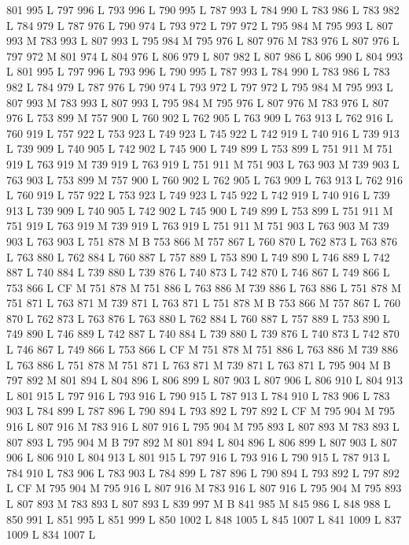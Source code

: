{{{{{{{{{{{{{{{{{{801 995 L
797 996 L
793 996 L
790 995 L
787 993 L
784 990 L
783 986 L
783 982 L
784 979 L
787 976 L
790 974 L
793 972 L
797 972 L
795 984 M 795 993 L
807 993 M 783 993 L
807 993 L
795 984 M 795 976 L
807 976 M 783 976 L
807 976 L
797 972 M 801 974 L
804 976 L
806 979 L
807 982 L
807 986 L
806 990 L
804 993 L
801 995 L
797 996 L
793 996 L
790 995 L
787 993 L
784 990 L
783 986 L
783 982 L
784 979 L
787 976 L
790 974 L
793 972 L
797 972 L
795 984 M 795 993 L
807 993 M 783 993 L
807 993 L
795 984 M 795 976 L
807 976 M 783 976 L
807 976 L
753 899 M 757 900 L
760 902 L
762 905 L
763 909 L
763 913 L
762 916 L
760 919 L
757 922 L
753 923 L
749 923 L
745 922 L
742 919 L
740 916 L
739 913 L
739 909 L
740 905 L
742 902 L
745 900 L
749 899 L
753 899 L
751 911 M 751 919 L
763 919 M 739 919 L
763 919 L
751 911 M 751 903 L
763 903 M 739 903 L
763 903 L
753 899 M 757 900 L
760 902 L
762 905 L
763 909 L
763 913 L
762 916 L
760 919 L
757 922 L
753 923 L
749 923 L
745 922 L
742 919 L
740 916 L
739 913 L
739 909 L
740 905 L
742 902 L
745 900 L
749 899 L
753 899 L
751 911 M 751 919 L
763 919 M 739 919 L
763 919 L
751 911 M 751 903 L
763 903 M 739 903 L
763 903 L
751 878 M B
753 866 M 757 867 L
760 870 L
762 873 L
763 876 L
763 880 L
762 884 L
760 887 L
757 889 L
753 890 L
749 890 L
746 889 L
742 887 L
740 884 L
739 880 L
739 876 L
740 873 L
742 870 L
746 867 L
749 866 L
753 866 L
CF M
751 878 M 751 886 L
763 886 M 739 886 L
763 886 L
751 878 M 751 871 L
763 871 M 739 871 L
763 871 L
751 878 M B
753 866 M 757 867 L
760 870 L
762 873 L
763 876 L
763 880 L
762 884 L
760 887 L
757 889 L
753 890 L
749 890 L
746 889 L
742 887 L
740 884 L
739 880 L
739 876 L
740 873 L
742 870 L
746 867 L
749 866 L
753 866 L
CF M
751 878 M 751 886 L
763 886 M 739 886 L
763 886 L
751 878 M 751 871 L
763 871 M 739 871 L
763 871 L
795 904 M B
797 892 M 801 894 L
804 896 L
806 899 L
807 903 L
807 906 L
806 910 L
804 913 L
801 915 L
797 916 L
793 916 L
790 915 L
787 913 L
784 910 L
783 906 L
783 903 L
784 899 L
787 896 L
790 894 L
793 892 L
797 892 L
CF M
795 904 M 795 916 L
807 916 M 783 916 L
807 916 L
795 904 M 795 893 L
807 893 M 783 893 L
807 893 L
795 904 M B
797 892 M 801 894 L
804 896 L
806 899 L
807 903 L
807 906 L
806 910 L
804 913 L
801 915 L
797 916 L
793 916 L
790 915 L
787 913 L
784 910 L
783 906 L
783 903 L
784 899 L
787 896 L
790 894 L
793 892 L
797 892 L
CF M
795 904 M 795 916 L
807 916 M 783 916 L
807 916 L
795 904 M 795 893 L
807 893 M 783 893 L
807 893 L
839 997 M B
841 985 M 845 986 L
848 988 L
850 991 L
851 995 L
851 999 L
850 1002 L
848 1005 L
845 1007 L
841 1009 L
837 1009 L
834 1007 L
}}}}}}}}}}}}}}}}}}
